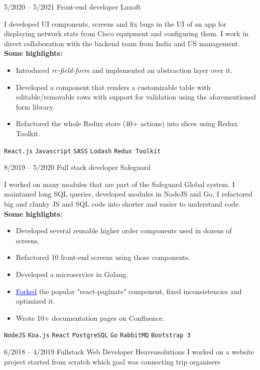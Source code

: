 \documentclass[9pt]{developercv} %
\begin{document}
\begin{entrylist}
	\entry
		{5/2020 -- 5/2021}
		{Front-end developer}
		{Luxoft}
		{ I developed UI components, screens and fix bugs in the UI of an app for displaying network stats from Cisco equipment and configuring them. 
			I work in direct collaboration with the backend team from India and US management.
		\\   \textbf{Some highlights:}
		\begin{itemize}
			\setlength\itemsep{0em}
				\item Introduced \textit{rc-field-form} and implemented an abstraction layer over it.
				\item Developed a component that renders a customizable table with editable/removable rows with support for validation using the aforementioned form library.
				\item Refactored the whole Redux store (40+ actions) into slices using Redux Toolkit.
		\end{itemize}
        \texttt{React.js}\slashsep
		\texttt{Javascript}\slashsep
		\texttt{SASS}\slashsep
		\texttt{Lodash}\slashsep
		\texttt{Redux Toolkit}
		}
	\entry
		{8/2019 -- 5/2020}
		{Full stack developer}
		{Safeguard}
		{I worked on many modules that are part of the Safeguard Global system. I maintaned 
		long SQL queries, developed modules in NodeJS and Go. I refactored big and
		 clunky JS and SQL code into shorter and easier to understand code. 
		\\   \textbf{Some highlights:}
		\begin{itemize}
			\setlength\itemsep{0em}
				\item Developed several reusable higher order components used in dozens of screens. 
				\item Refactored 10 front-end screens using those components. 
				\item Developed a microservice in Golang. 
				\item \href{https://www.npmjs.com/package/react-paginate-next}{\textcolor{blue}{\underline{Forked}}} the popular "react-paginate" component, fixed inconsistencies and optimized it.
				\item Wrote 10+ documentation pages on Confluence.
		\end{itemize}
		\texttt{NodeJS}\slashsep
		\texttt{Koa.js}\slashsep
		\texttt{React}\slashsep
		\texttt{PostgreSQL}\slashsep
		\texttt{Go}\slashsep
		\texttt{RabbitMQ}\slashsep
		\texttt{Bootstrap 3}
		}
	\entry
		{6/2018 -- 4/2019}
		{Fullstack Web Developer}
		{Heavensolutions}
		{I worked on a website project started from scratch which goal was connecting trip organisers 
}
\end{entrylist}
\end{document}
